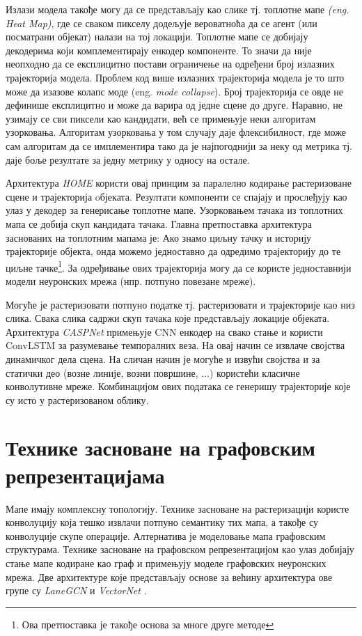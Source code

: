 \documentclass[11pt,oneside]{memoir}
\begin{document}
Излази модела такође могу да се представљају као слике тј. топлотне мапе \textit{(eng. Heat Map)}, где се сваком пикселу додељује вероватноћа
да се агент (или посматрани објекат) налази на тој локацији. Топлотне мапе се добијају декодерима који комплементирају енкодер компоненте.
То значи да није неопходно да се експлицитно постави ограничење на одређени број излазних трајекторија модела. Проблем
код више излазних трајекторија модела је то што може да изазове колапс моде (eng. \textit{mode collapse}). Број трајекторија се овде не 
дефинише експлицитно и може да варира од једне сцене до друге. Наравно, не узимају се сви пиксели као кандидати, већ се примењује неки
алгоритам узорковања. Алгоритам узорковања у том случају даје флексибилност, где може сам алгоритам да се имплементира тако
да је најпогоднији за неку од метрика тј. даје боље резултате за једну метрику у односу на остале. \cite{home} \cite{centernet} 

Архитектура \textit{HOME} \cite{home} користи овај принцим за паралелно кодирање растеризоване сцене и трајекторија oбјеката. Резултати
компоненти се спајају и прослеђују као улаз у декодер за генерисање топлотне мапе. Узорковањем тачака из топлотних мапа се добија скуп кандидата тачака.
Главна претпоставка архитектура заснованих на топлотним мапама је: Ако знамо циљну тачку и историју трајекторије објекта, онда можемо
једноставно да одредимо трајекторију до те циљне тачке\footnote{Ова претпоставка је такође основа за многе друге методе}. 
За одређивање ових трајекторија могу да се користе једноставнији модели неуронских мрежа (нпр. потпуно повезане мреже).

Могуће је растеризовати потпуно податке тј. растеризовати и трајекторије као низ слика. Свака слика садржи скуп тачака које представљају
локације објеката. Архитектура \textit{CASPNet} \cite{caspnet} примењује CNN енкодер на свако стање и користи ConvLSTM \cite{convlstm} за разумевање
темпоралних веза. На овај начин се извлаче својства динамичког дела сцена. На сличан начин је могуће и извући својства и за 
статички део (возне линије, возни површине, ...) користећи класичне конволутивне мреже. Комбинацијом ових података се генеришу
трајекторије које су исто у растеризованом облику.

\section{Технике засноване на графовским репрезентацијама}

Мапе имају комплексну топологију. Технике засноване на растеризацији користе конволуцију која тешко 
извлачи потпуно семантику тих мапа, а такође су конволуције скупе операције. Алтернатива је моделовање мапа графовским структурама. 
Технике засноване на графовском репрезентацијом као улаз добијају стање мапе кодиране као граф и примењују моделе графовских неуронских мрежа. 
Две архитектуре које представљају основе за већину архитектура ове групе су \textit{LaneGCN} \cite{lanegcn} и \textit{VectorNet} \cite{vectornet}.
\end{document}
